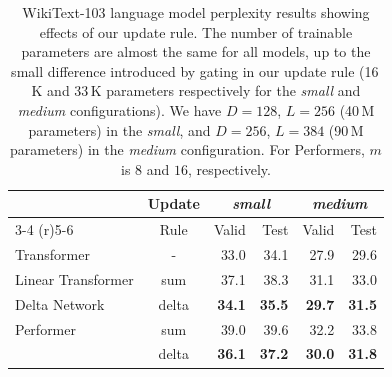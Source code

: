 \documentclass{article}
\theoremstyle{definition}
\begin{document}
\begin{table}[t]
\caption{WikiText-103 language model perplexity results
showing effects of our update rule.
The number of trainable parameters are almost the same for all models,
up to the small difference introduced by gating in our update rule (16\,K and 33\,K parameters
respectively for the \textit{small} and \textit{medium} configurations).
We have $D=128$, $L=256$ (40\,M parameters) in the \textit{small},
and $D=256$, $L=384$ (90\,M parameters) in the \textit{medium} configuration.
For Performers, $m$ is $8$ and $16$, respectively.
}
\label{tab:lm}
\vskip 0.15in
\begin{center}
\begin{small}
\begin{tabular}{lcrrrr}
\toprule
     &  Update  & \multicolumn{2}{c}{\textit{small}}  & \multicolumn{2}{c}{\textit{medium}} \\  \cmidrule(r){3-4}  \cmidrule(r){5-6}
          &  Rule  & \multicolumn{1}{r}{Valid} & \multicolumn{1}{r}{Test} & \multicolumn{1}{r}{Valid} & \multicolumn{1}{r}{Test}  \\ \midrule
Transformer   &   -      &  33.0  & 34.1  &  27.9   & 29.6 \\ \midrule
Linear Transformer   &   sum    &  37.1  & 38.3     &  31.1   & 33.0 \\
Delta Network          &  delta    &  \textbf{34.1}  & \textbf{35.5}  & \textbf{29.7} & \textbf{31.5} \\ \midrule
Performer &   sum    &  39.0  & 39.6  & 32.2 & 33.8 \\
          &  delta    &  \textbf{36.1}  & \textbf{37.2}  & \textbf{30.0} & \textbf{31.8} \\
\bottomrule
\end{tabular}
\end{small}
\end{center}
\vskip -0.1in

\end{table}
\end{document}

